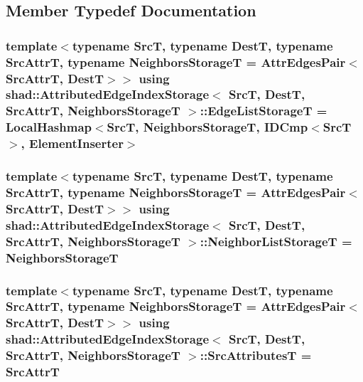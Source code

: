 \subsection{Member Typedef Documentation}
\hypertarget{classshad_1_1AttributedEdgeIndexStorage_ae0e7b167b48bf7a96060a37ae0bb2feb}{
\subsubsection[{Edge\-List\-Storage\-T}]{\setlength{\rightskip}{0pt plus 5cm}template$<$typename Src\-T, typename Dest\-T, typename Src\-Attr\-T, typename Neighbors\-Storage\-T = Attr\-Edges\-Pair$<$\-Src\-Attr\-T, Dest\-T$>$$>$ using {\bf shad\-::\-Attributed\-Edge\-Index\-Storage}$<$ Src\-T, Dest\-T, Src\-Attr\-T, Neighbors\-Storage\-T $>$\-::{\bf Edge\-List\-Storage\-T} =  {\bf Local\-Hashmap}$<$Src\-T, Neighbors\-Storage\-T, {\bf I\-D\-Cmp}$<$Src\-T$>$, {\bf Element\-Inserter}$>$}}\label{classshad_1_1AttributedEdgeIndexStorage_ae0e7b167b48bf7a96060a37ae0bb2feb}
\hypertarget{classshad_1_1AttributedEdgeIndexStorage_a496b746cebb44b3675c14c22531f6bc5}{
\subsubsection[{Neighbor\-List\-Storage\-T}]{\setlength{\rightskip}{0pt plus 5cm}template$<$typename Src\-T, typename Dest\-T, typename Src\-Attr\-T, typename Neighbors\-Storage\-T = Attr\-Edges\-Pair$<$\-Src\-Attr\-T, Dest\-T$>$$>$ using {\bf shad\-::\-Attributed\-Edge\-Index\-Storage}$<$ Src\-T, Dest\-T, Src\-Attr\-T, Neighbors\-Storage\-T $>$\-::{\bf Neighbor\-List\-Storage\-T} =  Neighbors\-Storage\-T}}\label{classshad_1_1AttributedEdgeIndexStorage_a496b746cebb44b3675c14c22531f6bc5}
\hypertarget{classshad_1_1AttributedEdgeIndexStorage_a9fcd3421b5de8fee1520bb001bae13d5}{
\subsubsection[{Src\-Attributes\-T}]{\setlength{\rightskip}{0pt plus 5cm}template$<$typename Src\-T, typename Dest\-T, typename Src\-Attr\-T, typename Neighbors\-Storage\-T = Attr\-Edges\-Pair$<$\-Src\-Attr\-T, Dest\-T$>$$>$ using {\bf shad\-::\-Attributed\-Edge\-Index\-Storage}$<$ Src\-T, Dest\-T, Src\-Attr\-T, Neighbors\-Storage\-T $>$\-::{\bf Src\-Attributes\-T} =  Src\-Attr\-T}}\label{classshad_1_1AttributedEdgeIndexStorage_a9fcd3421b5de8fee1520bb001bae13d5}


